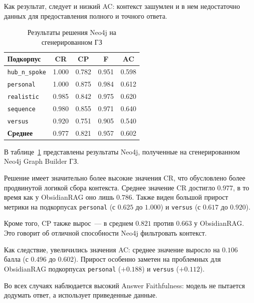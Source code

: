 Как результат, следует и низкий AC:
контекст зашумлен и в нем недостаточно
данных для предоставления
полного и точного ответа.

\begin{table}[H]
    \caption{Результаты решения Neo4j на сгенерированном ГЗ}
    \label{tab:reference_results_neo4j}
    \centering
    \begin{tabular}{lcccc}
        \hline
        \textbf{Подкорпус}     & \textbf{CR} & \textbf{CP} & \textbf{F} & \textbf{AC} \\
        \hline
        \texttt{hub\_n\_spoke} & 1.000       & 0.782       & 0.951      & 0.598       \\
        \texttt{personal}      & 1.000       & 0.875       & 0.984      & 0.612       \\
        \texttt{realistic}     & 0.985       & 0.842       & 0.975      & 0.620       \\
        \texttt{sequence}      & 0.980       & 0.855       & 0.971      & 0.640       \\
        \texttt{versus}        & 0.920       & 0.751       & 0.905      & 0.540       \\
        \hline
        \textbf{Среднее}       & 0.977       & 0.821       & 0.957      & 0.602       \\
        \hline
    \end{tabular}
\end{table}

В таблице~\ref{tab:reference_results_neo4j} представлены результаты Neo4j,
полученные на сгенерированном Neo4j Graph Builder ГЗ.

Решение имеет значительно более высокие значения CR,
что обусловлено более продвинутой логикой сбора контекста.
Среднее значение CR достигло $0.977$,
в то время как у ObsidianRAG оно лишь $0.786$.
Также виден большой прирост метрики на подкорпусах
\texttt{personal} (с $0.625$ до $1.000$) и
\texttt{versus} (с $0.617$ до $0.920$).

Кроме того, CP также вырос~---
в среднем $0.821$ против $0.663$ у ObsidianRAG.
Это говорит об отличной способности Neo4j фильтровать контекст.

Как следствие, увеличились значения AC:
среднее значение выросло на $0.106$ балла (с $0.496$ до $0.602$).
Прирост особенно заметен на проблемных для ObsidianRAG подкорпусах
\texttt{personal} ($+0.188$) и \texttt{versus} ($+0.112$).

Во всех случаях наблюдается высокий Answer Faithfulness:
модель не пытается додумать ответ, а использует приведенные данные.

